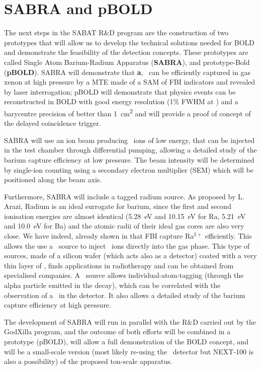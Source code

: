 \documentclass[a4paper,11pt]{article}
\begin{document}

\section{SABRA and pBOLD}


The next steps in the SABAT R\&D program are the construction of two prototypes that will allow us to develop the technical solutions needed for BOLD and demonstrate the feasibility of the detection concepts. These prototypes are called Single Atom Barium-Radium Apparatus (\textbf{SABRA}), and prototype-Bold (\textbf{pBOLD}). SABRA will demonstrate that \textbf{a}, \Bapp\ can be efficiently captured in gas xenon at high pressure by a MTE made of a SAM of FBI indicators and revealed by laser interrogation; pBOLD will demonstrate that physics events can be reconstructed in BOLD with good energy resolution (1\% FWHM at \Qbb) and a barycentre precision of better than \SI{1}{cm^2} and will provide a proof of concept of the delayed coincidence trigger.  

SABRA will use an ion beam producing \Bapp\ ions of low energy, that can be injected in the test chamber through differential pumping, allowing a detailed study of the barium capture efficiency at low pressure. The beam intensity will be determined by single-ion counting using a secondary electron multiplier (SEM) which will be positioned along the beam axis. 

Furthermore, SABRA will include  a tagged radium source. As proposed by L. Arazi, Radium is an ideal surrogate for barium, since  the first and second ionisation energies are almost identical (\SI{5.28}{eV} and \SI{10.15}{eV} for Ra, \SI{5.21}{eV} and \SI{10.0}{eV} for Ba) and the atomic radii of their ideal gas cores are also very close. We have indeed, already shown in\cite{Rivilla:2019vzd, Rivilla:2020cvm} that FBI capture Ra$^{2+}$ efficiently.  This allows the use a \TO\ source to inject \Rapp\ ions directly into the gas phase. This type of sources, made of a silicon wafer (which acts also as a detector) coated with a very thin layer of \TO, finds applications in radiotherapy and can be obtained from specialised companies. A \Rapp\ source allows individual-atom-tagging (through the alpha particle emitted in the decay), which can be correlated with the observation of a \Rapp\ in the detector. It also allows a detailed study of the barium capture efficiency at high pressure.  

The development of SABRA will run in parallel with the R\&D carried out by the GodXilla program, and the outcome of both efforts will be combined in a prototype (pBOLD), will allow a full demonstration of the BOLD concept, and will be a small-scale version (most likely re-using the \NEW\ detector but NEXT-100 is also a possibility) of the proposed ton-scale apparatus.
 


%


\end{document}

